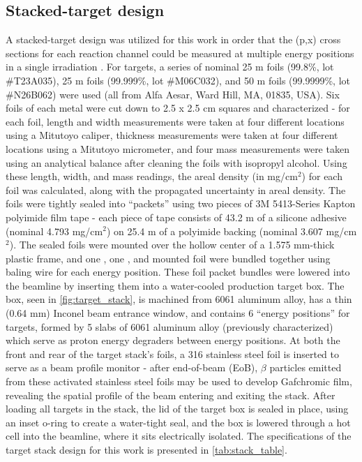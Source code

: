 \documentclass[3p]{elsarticle}
\newcommand{\comment}[1]{\todo[color=blue!20!white,inline]{ASV: #1}}
\begin{document}
\subsection{Stacked-target design }\label{sec:target_design}


A stacked-target design was utilized for this work in order that the (p,x) cross sections for each reaction channel could be measured at multiple energy positions in a single irradiation \cite{Cumming1963}. 
For targets, a series of nominal 25 \micro m  foils (99.8\%, lot \#T23A035), 25 \micro m  foils (99.999\%, lot \#M06C032), and 50 \micro m  foils (99.9999\%, lot \#N26B062) were used (all from Alfa Aesar, Ward Hill, MA, 01835, USA).
Six foils of each metal were cut down to 2.5 x 2.5 cm squares and characterized - for each foil, length and width measurements were taken at four different locations using a Mitutoyo caliper, thickness measurements were taken at four different locations using a Mitutoyo micrometer, and four mass measurements were taken using an analytical balance after cleaning the foils with isopropyl alcohol.
Using these length, width, and mass readings, the areal density (in mg/cm$^2$) for each foil was calculated, along with the propagated uncertainty in areal density.
The foils were tightly sealed into \enquote{packets} using two pieces of  3M 5413-Series Kapton polyimide film tape - each piece of tape consists of 43.2 \micro m of a silicone adhesive (nominal 4.793 mg/cm$^2$) on 25.4 \micro m of a polyimide backing (nominal 3.607 mg/cm$^2$).
The sealed foils were mounted over the hollow center of a 1.575 mm-thick plastic frame, and one , one , and  mounted foil were bundled together using baling wire for each energy position.
These foil packet bundles were lowered into the beamline by inserting them into a  water-cooled production target box.
The box, seen in \autoref{fig:target_stack}, is machined from 6061 aluminum alloy, has a thin (0.64 mm) Inconel beam entrance window, and  contains 6 \enquote{energy positions} for targets, formed by  5 slabs of 6061 aluminum alloy (previously characterized) which serve as proton energy degraders  between energy positions.
At both the front and rear of the target stack's foils, a 316 stainless steel foil is inserted to serve as a beam profile monitor - after end-of-beam (EoB), $\beta$ particles emitted from these activated stainless steel foils may be used to develop Gafchromic film, revealing the spatial profile of the beam entering and exiting the stack.
After loading all targets in the stack, the lid of the target box is sealed in place, using an inset o-ring to create a water-tight seal, and the box is lowered through a hot cell into the beamline, where it sits electrically isolated.
The specifications of the target stack design for this work is presented in \autoref{tab:stack_table}.
\end{document}
